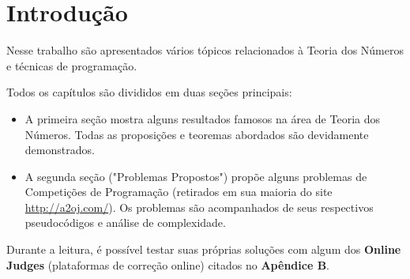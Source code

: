 
\chapter{Introdução} %

\label{Chapter1} %


Nesse trabalho são apresentados vários tópicos relacionados à Teoria dos Números e técnicas de programação.
\newline

Todos os capítulos são divididos em duas seções principais:

\begin{itemize}

\item A primeira seção mostra alguns resultados famosos na área de Teoria dos Números. Todas as proposições e teoremas abordados são devidamente demonstrados.

\item A segunda seção ("Problemas Propostos") propõe alguns problemas de Competições de Programação (retirados em sua maioria do site \url{http://a2oj.com/}).
Os problemas são acompanhados de seus respectivos pseudocódigos e análise de complexidade.

\end{itemize}

Durante a leitura, é possível testar suas próprias soluções com algum dos \textbf{Online Judges} (plataformas de correção online) citados no \textbf{Apêndice B}.

